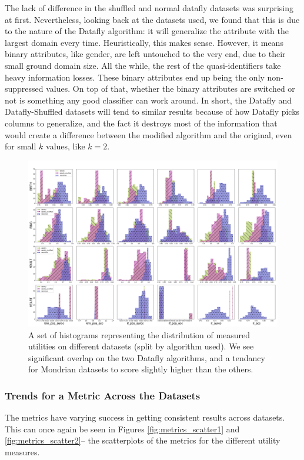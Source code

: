 The lack of difference in the shuffled and normal datafly datasets was surprising at first. Nevertheless, looking back at the datasets used, we found that this is due to the nature of the Datafly algorithm: it will generalize the attribute with the largest domain every time. Heuristically, this makes sense. However, it means binary attributes, like gender, are left untouched to the very end, due to their small ground domain size. All the while, the rest of the quasi-identifiers take heavy information losses. These binary attributes end up being the only non-suppressed values. On top of that, whether the binary attributes are switched or not is something any good classifier can work around. In short, the Datafly and Datafly-Shuffled datasets will tend to similar results because of how Datafly picks columns to generalize, and the fact it destroys most of the information that would create a difference between the modified algorithm and the original, even for small $k$ values, like $k=2$.

\begin{figure}
    \centerfloat
    \includegraphics[width=1.2\textwidth]{project/fig/pat_full_accs.png}
    \caption{A set of histograms representing the distribution of measured utilities on different datasets (split by algorithm used). We see significant overlap on the two Datafly algorithms, and a tendancy for Mondrian datasets to score slightly higher than the others.}
    \label{fig:hist_accs_perd}
\end{figure}

\subsubsection{Trends for a Metric Across the Datasets}
\label{subsec:trends_datasets}
The metrics have varying success in getting consistent results across datasets. This can once again be seen in Figures \ref{fig:metrics_scatter1} and \ref{fig:metrics_scatter2}-- the scatterplots of the metrics for the different utility measures. 

